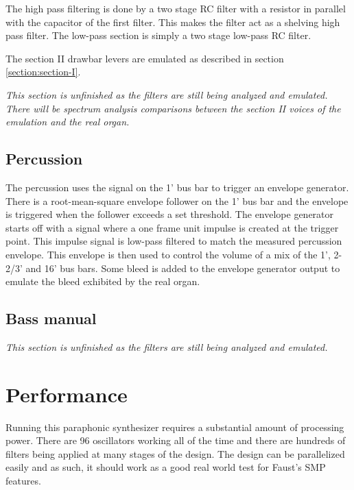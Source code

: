 \documentclass[11pt,a4paper]{article}
\begin{document}

The high pass filtering is done by a two stage RC filter with a resistor in parallel with the capacitor of the first filter. This makes the filter act as a shelving high pass filter. The low-pass section is simply a two stage low-pass RC filter.

The section II drawbar levers are emulated as described in section \ref{section:section-I}.

\emph{This section is unfinished as the filters are still being analyzed and emulated. There will be spectrum analysis comparisons between the section II voices of the emulation and the real organ.}


\subsection{Percussion}

The percussion uses the signal on the 1' bus bar to trigger an envelope generator. There is a root-mean-square envelope follower on the 1' bus bar and the envelope is triggered when the follower exceeds a set threshold. The envelope generator starts off with a signal where a one frame unit impulse is created at the trigger point. This impulse signal is low-pass filtered to match the measured percussion envelope. This envelope is then used to control the volume of a mix of the 1', 2-2/3' and 16' bus bars. Some bleed is added to the envelope generator output to emulate the bleed exhibited by the real organ.

\subsection{Bass manual}

\emph{This section is unfinished as the filters are still being analyzed and emulated.}

\section{Performance}
\label{section:performance}

Running this paraphonic synthesizer requires a substantial amount of processing power. There are 96 oscillators working all of the time and there are hundreds of filters being applied at many stages of the design. The design can be parallelized easily and as such, it should work as a good real world test for Faust's SMP features.
\end{document}

